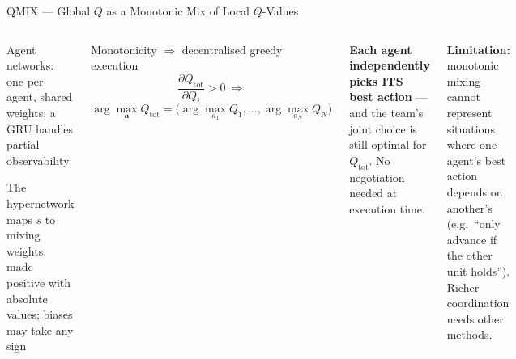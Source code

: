 \documentclass[aspectratio=169,10pt,t]{beamer}
\begin{document}
\begin{frame}{QMIX --- Global $Q$ as a Monotonic Mix of Local $Q$-Values}
\begin{columns}[T]
\begin{tl}\item Agent networks: one per agent, shared weights; a GRU handles partial observability\item The hypernetwork maps $s$ to mixing weights, made positive with absolute values; biases may take any sign\end{tl}
\begin{fbx}{Monotonicity $\Rightarrow$ decentralised greedy execution}\[\frac{\partial Q_{\text{tot}}}{\partial Q_i}>0\ \Rightarrow\]\[\arg\max_{\mathbf a}Q_{\text{tot}}=\big(\arg\max_{a_1}Q_1,\ldots,\arg\max_{a_N}Q_N\big)\]\end{fbx}
\begin{rbox}\scriptsize\textbf{Each agent independently picks ITS best action} --- and the team's joint choice is still optimal for $Q_{\text{tot}}$. No negotiation needed at execution time.\end{rbox}
\begin{wbox}\scriptsize\textbf{Limitation:} monotonic mixing cannot represent situations where one agent's best action depends on another's (e.g.\ ``only advance if the other unit holds''). Richer coordination needs other methods.\end{wbox}
\end{columns}
\end{frame}
\end{document}
